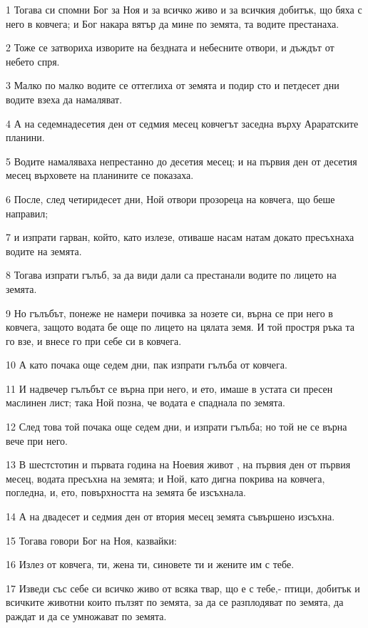 \par 1 Тогава си спомни Бог за Ноя и за всичко живо и за всичкия добитък, що бяха с него в ковчега; и Бог накара вятър да мине по земята, та водите престанаха.
\par 2 Тоже се затвориха изворите на бездната и небесните отвори, и дъждът от небето спря.
\par 3 Малко по малко водите се оттеглиха от земята и подир сто и петдесет дни водите взеха да намаляват.
\par 4 А на седемнадесетия ден от седмия месец ковчегът заседна върху Араратските планини.
\par 5 Водите намаляваха непрестанно до десетия месец; и на първия ден от десетия месец върховете на планините се показаха.
\par 6 После, след четиридесет дни, Ной отвори прозореца на ковчега, що беше направил;
\par 7 и изпрати гарван, който, като излезе, отиваше насам натам докато пресъхнаха водите на земята.
\par 8 Тогава изпрати гълъб, за да види дали са престанали водите по лицето на земята.
\par 9 Но гълъбът, понеже не намери почивка за нозете си, върна се при него в ковчега, защото водата бе още по лицето на цялата земя. И той простря ръка та го взе, и внесе го при себе си в ковчега.
\par 10 А като почака още седем дни, пак изпрати гълъба от ковчега.
\par 11 И надвечер гълъбът се върна при него, и ето, имаше в устата си пресен маслинен лист; така Ной позна, че водата е спаднала по земята.
\par 12 След това той почака още седем дни, и изпрати гълъба; но той не се върна вече при него.
\par 13 В шестстотин и първата година на Ноевия живот , на първия ден от първия месец, водата пресъхна на земята; и Ной, като дигна покрива на ковчега, погледна, и, ето, повърхността на земята бе изсъхнала.
\par 14 А на двадесет и седмия ден от втория месец земята съвършено изсъхна.
\par 15 Тогава говори Бог на Ноя, казвайки:
\par 16 Излез от ковчега, ти, жена ти, синовете ти и жените им с тебе.
\par 17 Изведи със себе си всичко живо от всяка твар, що е с тебе,- птици, добитък и всичките животни които пълзят по земята, за да се разплодяват по земята, да раждат и да се умножават по земята.
